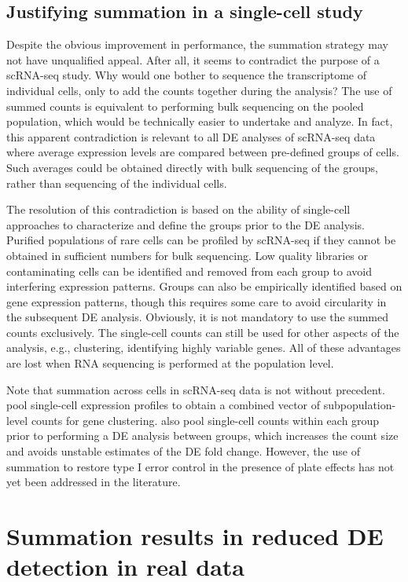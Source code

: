 \documentclass[oupdraft]{bio}
\begin{document}
\subsection{Justifying summation in a single-cell study}
Despite the obvious improvement in performance, the summation strategy may not have unqualified appeal.
After all, it seems to contradict the purpose of a scRNA-seq study. 
Why would one bother to sequence the transcriptome of individual cells, only to add the counts together during the analysis?
The use of summed counts is equivalent to performing bulk sequencing on the pooled population, which would be technically easier to undertake and analyze.
In fact, this apparent contradiction is relevant to all DE analyses of scRNA-seq data where average expression levels are compared between pre-defined groups of cells.
Such averages could be obtained directly with bulk sequencing of the groups, rather than sequencing of the individual cells.

The resolution of this contradiction is based on the ability of single-cell approaches to characterize and define the groups prior to the DE analysis.
Purified populations of rare cells can be profiled by scRNA-seq if they cannot be obtained in sufficient numbers for bulk sequencing.
Low quality libraries or contaminating cells can be identified and removed from each group to avoid interfering expression patterns.
Groups can also be empirically identified based on gene expression patterns, though this requires some care to avoid circularity in the subsequent DE analysis.
Obviously, it is not mandatory to use the summed counts exclusively. 
The single-cell counts can still be used for other aspects of the analysis, e.g., clustering, identifying highly variable genes.
All of these advantages are lost when RNA sequencing is performed at the population level.

Note that summation across cells in scRNA-seq data is not without precedent.
\cite{jaitin2014massively} pool single-cell expression profiles to obtain a combined vector of subpopulation-level counts for gene clustering.
\cite{klein2015droplet} also pool single-cell counts within each group prior to performing a DE analysis between groups,
    which increases the count size and avoids unstable estimates of the DE fold change.
However, the use of summation to restore type I error control in the presence of plate effects has not yet been addressed in the literature.

\section{Summation results in reduced DE detection in real data}
\end{document}
